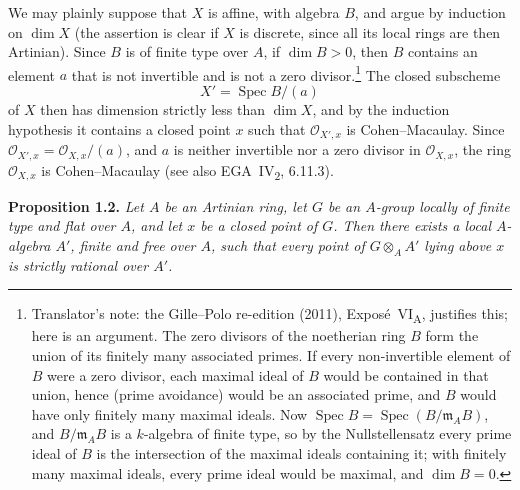 \medskip
We may plainly suppose that \(X\) is affine, with algebra \(B\), and argue
by induction on \(\dim X\) (the assertion is clear if \(X\) is discrete,
since all its local rings are then Artinian). Since \(B\) is of finite type
over \(A\), if \(\dim B>0\), then \(B\) contains an element \(a\) that is
not invertible and is not a zero divisor.\footnote{Translator's note: the Gille--Polo re-edition (2011),
Exposé~VI\textsubscript{A}, justifies this; here is an argument. The zero divisors of the noetherian
ring \(B\) form the union of its finitely many associated primes. If every non-invertible element of
\(B\) were a zero divisor, each maximal ideal of \(B\) would be contained in that union, hence (prime
avoidance) would be an associated prime, and \(B\) would have only finitely many maximal ideals. Now
\(\operatorname{Spec}B=\operatorname{Spec}(B/\mathfrak m_AB)\), and \(B/\mathfrak m_AB\) is a
\(k\)-algebra of finite type, so by the Nullstellensatz every prime ideal of \(B\) is the intersection
of the maximal ideals containing it; with finitely many maximal ideals, every prime ideal would be
maximal, and \(\dim B=0\).}
The closed subscheme
\[
  X'=\operatorname{Spec} B/(a)
\]
of \(X\) then has dimension strictly less than \(\dim X\), and by the
induction hypothesis it contains a closed point \(x\) such that
\(\mathcal O_{X',x}\) is Cohen--Macaulay. Since
\(\mathcal O_{X',x}=\mathcal O_{X,x}/(a)\), and \(a\) is neither invertible
nor a zero divisor in \(\mathcal O_{X,x}\), the ring
\(\mathcal O_{X,x}\) is Cohen--Macaulay (see also EGA~IV\textsubscript{2},
6.11.3).

\medskip
{}\label{prop:sga3-VIA-1.2}%
\noindent\textbf{Proposition 1.2.}
\textit{Let \(A\) be an Artinian ring, let \(G\) be an \(A\)-group
locally of finite type and flat over \(A\), and let \(x\) be a closed point
of \(G\). Then there exists a local \(A\)-algebra \(A'\), finite and free
over \(A\), such that every point of \(G\otimes_A A'\) lying above \(x\)
is strictly rational over \(A'\).}


